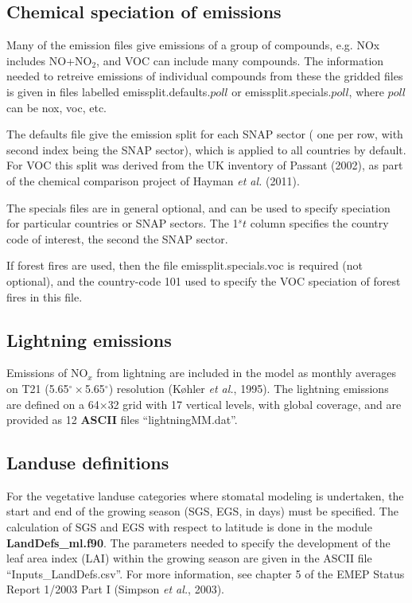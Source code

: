 \documentclass[a4paper,12pt]{report}
\newcommand{\NEW}[1]{{\color{blue}{#1}}}
\begin{document}
\subsection{Chemical speciation of emissions}

Many of the emission files give emissions of a group of compounds, e.g.
NOx includes NO+NO$_2$, and VOC can include many compounds. The information
needed to retreive emissions of individual compounds from these the
gridded files is given in  files labelled emissplit.defaults.$poll$ or
emissplit.specials.$poll$, where $poll$ can be nox, voc, etc.

The defaults file give the emission split for each SNAP sector (
one per row, with second index being the SNAP sector), which
is applied to all countries by default. For VOC this split
was derived from the UK inventory of Passant (2002),
as part of the chemical comparison project of Hayman {\sl et al.} (2011).

The specials files are in general optional, and can be used to specify
speciation for particular countries or SNAP sectors. The
1${^st}$ column specifies the country code of interest, the second the SNAP sector. 

If forest fires are used, then the file emissplit.specials.voc is required
(not optional), and the country-code 101 used to specify the VOC speciation
of forest fires in this file.

\subsection{Lightning emissions}
Emissions of NO$_{x}$ from lightning are included in the model
as monthly averages on T21 (5.65$^{\circ}\times$5.65$^{\circ}$) resolution (K{\o}hler {\sl et al.}, 1995). 
The lightning emissions are defined on a 64$\times$32 grid with 17 vertical
levels, with global coverage, and are provided as 12 {\bf ASCII} files
``lightningMM.dat''.

\subsection{Landuse definitions}
For the vegetative landuse categories where stomatal modeling is
undertaken, the start and end of the growing season (SGS, EGS, in days) must be specified. 
The calculation of SGS and EGS with respect to latitude is done 
in the module {\bf LandDefs\_ml.f90}. 
The parameters needed to specify the
development of the leaf area index (LAI) within the growing season
are given in the ASCII file ``Inputs\_LandDefs.csv''. 
For more information, see chapter 5  of the EMEP Status Report 1/2003 Part I (Simpson {\sl et al.}, 2003).
\end{document}
